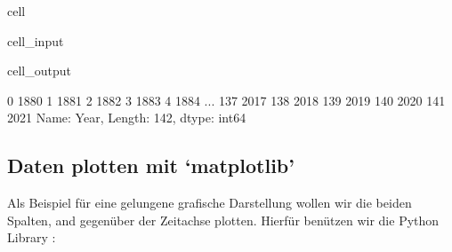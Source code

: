 \documentclass[letterpaper,10pt,english]{jupyterBook}
\begin{document}
\begin{sphinxuseclass}{cell}\begin{sphinxVerbatimInput}

\begin{sphinxuseclass}{cell_input}
\begin{sphinxVerbatim}[commandchars=\\\{\}]
\PYG{p}{[}\PYG{p}{]}
\end{sphinxVerbatim}

\end{sphinxuseclass}\end{sphinxVerbatimInput}
\begin{sphinxVerbatimOutput}

\begin{sphinxuseclass}{cell_output}
\begin{sphinxVerbatim}[commandchars=\\\{\}]
0      1880
1      1881
2      1882
3      1883
4      1884
       ... 
137    2017
138    2018
139    2019
140    2020
141    2021
Name: Year, Length: 142, dtype: int64
\end{sphinxVerbatim}

\end{sphinxuseclass}\end{sphinxVerbatimOutput}

\end{sphinxuseclass}

\subsection{Daten plotten mit ‘matplotlib’}
\label{\detokenize{content/T_Plotten:daten-plotten-mit-matplotlib}}
\sphinxAtStartPar
Als Beispiel für eine gelungene grafische Darstellung wollen wir die beiden Spalten,  and  gegenüber der Zeitachse  plotten. Hierfür benützen wir die Python Library :
\end{document}
